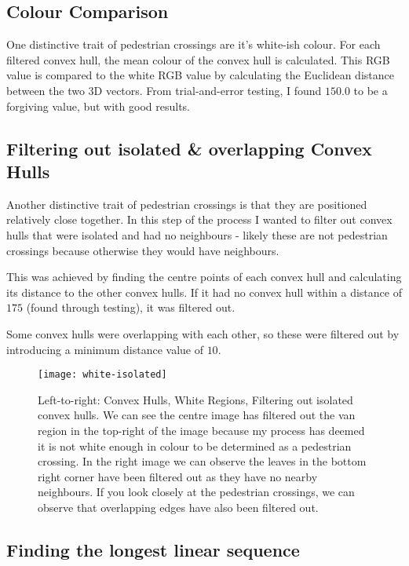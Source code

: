 \documentclass{article}  %
\begin{document}
	\subsection{Colour Comparison}
	
	One distinctive trait of pedestrian crossings are it's white-ish colour. For each filtered convex hull, the mean colour of the convex hull is calculated. This RGB value is compared to the white RGB value by calculating the Euclidean distance between the two 3D vectors. From trial-and-error testing, I found $150.0$ to be a forgiving value, but with good results.
	
	\subsection{Filtering out isolated \& overlapping Convex Hulls}
	
	Another distinctive trait of pedestrian crossings is that they are positioned relatively close together. In this step of the process I wanted to filter out convex hulls that were isolated and had no neighbours - likely these are not pedestrian crossings because otherwise they would have neighbours.
	
	This was achieved by finding the centre points of each convex hull and calculating its distance to the other convex hulls. If it had no convex hull within a distance of $175$ (found through testing), it was filtered out.
	
	Some convex hulls were overlapping with each other, so these were filtered out by introducing a minimum distance value of $10$.
	
	\begin{figure}[H]
		\centering
		\texttt{[image: white-isolated]}
		\caption{Left-to-right: Convex Hulls, White Regions, Filtering out isolated convex hulls. We can see the centre image has filtered out the van region in the top-right of the image because my process has deemed it is not white enough in colour to be determined as a pedestrian crossing. In the right image we can observe the leaves in the bottom right corner have been filtered out as they have no nearby neighbours. If you look closely at the pedestrian crossings, we can observe that overlapping edges have also been filtered out.}
	\end{figure}
	
	\subsection{Finding the longest linear sequence}\label{longest-linear-sequence}
	
\end{document}

